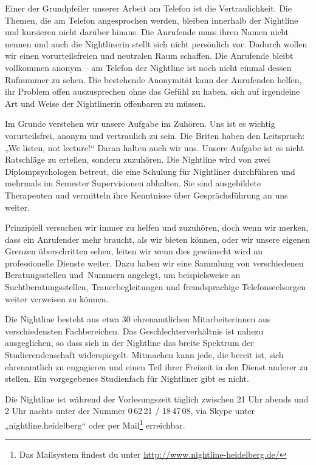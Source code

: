 Einer der Grundpfeiler unserer Arbeit am Telefon ist die Vertraulichkeit. Die Themen, die am Telefon angesprochen werden, bleiben innerhalb der Nightline und kursieren nicht darüber hinaus. Die Anrufende muss ihren Namen nicht nennen und auch die Nightlinerin stellt sich nicht persönlich vor. Dadurch wollen wir einen vorurteilsfreien und neutralen Raum schaffen. Die Anrufende bleibt vollkommen anonym – am Telefon der Nightline ist noch nicht einmal dessen Rufnummer zu sehen. Die bestehende Anonymität kann der Anrufenden helfen, ihr Problem offen auszusprechen ohne das Gefühl zu haben, sich auf irgendeine Art und Weise der Nightlinerin offenbaren zu müssen.

Im Grunde verstehen wir unsere Aufgabe im Zuhören. Uns ist es wichtig vorurteilsfrei, anonym und vertraulich zu sein. Die Briten haben den Leitspruch: „We listen, not lecture!“ Daran halten auch wir uns. Unsere Aufgabe ist es nicht Ratschläge zu erteilen, sondern zuzuhören. Die Nightline wird von zwei Diplompsychologen betreut, die eine Schulung für Nightliner durchführen und mehrmals im Semester Supervisionen abhalten. Sie sind ausgebildete Therapeuten und vermitteln ihre Kenntnisse über Gesprächsführung an uns weiter.

Prinzipiell versuchen wir immer zu helfen und zuzuhören, doch wenn wir merken, dass ein Anrufender mehr braucht, als wir bieten können, oder wir unsere eigenen Grenzen überschritten sehen, leiten wir wenn dies gewünscht wird an professionelle Dienste weiter. Dazu haben wir eine Sammlung von verschiedenen Beratungsstellen und~Nummern angelegt, um beispielsweise an Suchtberatungsstellen, Trauerbegleitungen und fremdsprachige Telefonseelsorgen weiter verweisen zu können.

Die Nightline besteht aus etwa 30 ehrenamtlichen Mitarbeiterinnen aus verschiedensten Fachbereichen. Das Geschlechterverhältnis ist nahezu ausgeglichen, so dass sich in der Nightline das breite Spektrum der Studierendenschaft widerspiegelt. Mitmachen kann jede, die bereit ist, sich ehrenamtlich zu engagieren und einen Teil ihrer Freizeit in den Dienst anderer zu stellen. Ein vorgegebenes Studienfach für Nightliner gibt es nicht.

Die Nightline ist während der Vorlesungszeit täglich zwischen 21 Uhr abends und 2 Uhr nachts unter der Nummer 0\,62\,21 / 18\,47\,08, via Skype unter „nightline.heidelberg“ oder per Mail\footnote{Das Mailsystem findest du unter \url{http://www.nightline-heidelberg.de/}} erreichbar.
